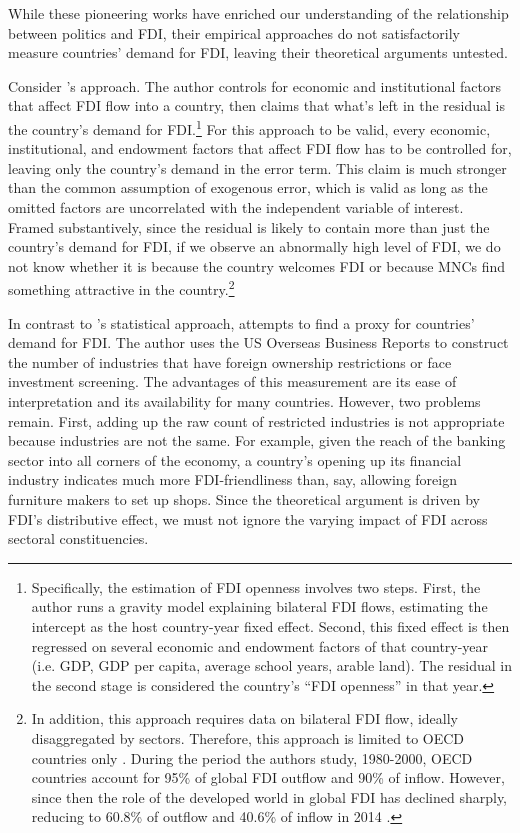 While these pioneering works have enriched our understanding of the relationship
between politics and FDI, their empirical approaches do not satisfactorily
measure countries' demand for FDI, leaving their theoretical arguments untested.

Consider \citet{Pinto2013}'s approach. The author controls for economic and
institutional factors that affect FDI flow into a country, then claims that
what's left in the residual is the country's demand for
FDI.\footnote{Specifically, the estimation of FDI openness involves two steps.
  First, the author runs a gravity model explaining bilateral FDI flows,
  estimating the intercept as the host country-year fixed effect. Second, this
  fixed effect is then regressed on several economic and endowment factors of
  that country-year (i.e. GDP, GDP per capita, average school years, arable
  land). The residual in the second stage is considered the country's ``FDI
  openness'' in that year.} For this approach to be valid, every economic,
institutional, and endowment factors that affect FDI flow has to be controlled
for, leaving only the country's demand in the error term. This claim is much
stronger than the common assumption of exogenous error, which is valid as long
as the omitted factors are uncorrelated with the independent variable of
interest. Framed substantively, since the residual is likely to contain more
than just the country's demand for FDI, if we observe an abnormally high level
of FDI, we do not know whether it is because the country welcomes FDI or because
MNCs find something attractive in the country.\footnote{In addition, this
  approach requires data on bilateral FDI flow, ideally disaggregated by
  sectors. Therefore, this approach is limited to OECD countries only
  \citep{Pinto2008}. During the period the authors study, 1980-2000, OECD
  countries account for 95\% of global FDI outflow and 90\% of inflow. However,
  since then the role of the developed world in global FDI has declined sharply,
  reducing to 60.8\% of outflow and 40.6\% of inflow in 2014
  \citep{UNCTAD2015}.}

In contrast to \citet{Pinto2013}'s statistical approach, \citet{Pandya2014,
  Pandya2016} attempts to find a proxy for countries' demand for FDI. The author
uses the US Overseas Business Reports to construct the number of
industries that have foreign ownership restrictions or face investment
screening. The advantages of this measurement are its ease of interpretation and
its availability for many countries. However, two problems remain. First, adding
up the raw count of restricted industries is not appropriate because industries
are not the same. For example, given the reach of the banking sector into all
corners of the economy, a country's opening up its financial industry indicates
much more FDI-friendliness than, say, allowing foreign furniture makers to set
up shops. Since the theoretical argument is driven by FDI's distributive effect,
we must not ignore the varying impact of FDI across sectoral constituencies.

